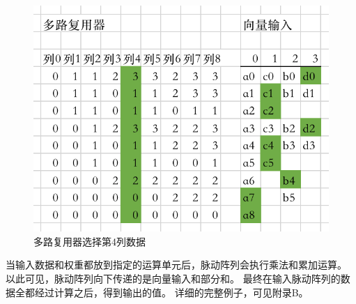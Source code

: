 \begin{figure}[htbp]
    \centering
    \includegraphics[width=12cm]{figures/systolic_data_col4.png}
    \caption{多路复用器选择第4列数据}
    \label{fig:systolic_data_col4}
\end{figure} 
当输入数据和权重都放到指定的运算单元后，脉动阵列会执行乘法和累加运算。
以此可见，脉动阵列向下传递的是向量输入和部分和。
最终在输入脉动阵列的数据全都经过计算之后，得到输出的值。
详细的完整例子，可见附录B。



